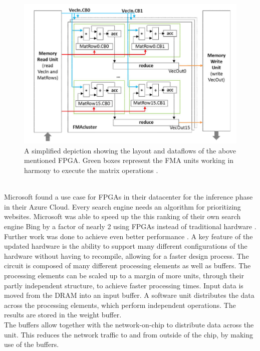 \documentclass[conference]{IEEEtran}
\begin{document}
	\begin{figure}[h]
		\centering
		\includegraphics[width=\linewidth]{pictures/fpga_operations.png}
		\caption{A simplified depiction showing the layout and dataflows of the above mentioned FPGA. Green boxes represent the FMA units working in harmony to execute the matrix operations \cite{nurvitadhi2016accelerating}.}
		\label{fig:fpgahw}
	\end{figure}
	\\
	Microsoft found a use case for FPGAs in their datacenter for the inference phase in their Azure Cloud. Every search engine needs an algorithm for prioritizing websites. Microsoft was able to speed up the this ranking of their own search engine Bing by a factor of nearly 2 using FPGAs instead of traditional hardware \cite{putnam2014reconfigurable}. Further work was done to achieve even better performance \cite{ovtcharov2015accelerating}. A key feature of the updated hardware is the ability to support many different configurations of the hardware without having to recompile, allowing for a faster design process. The circuit is composed of many different processing elements as well as buffers. The processing elements can be scaled up to a margin of more units, through their partly independent structure, to achieve faster processing times. Input data is moved from the DRAM into an input buffer. A software unit distributes the data across the processing elements, which perform independent operations. The results are stored in the weight buffer.
	\\
	The buffers allow together with the network-on-chip to distribute data across the unit. This reduces the network traffic to and from outside of the chip, by making use of the buffers. 
	\\
	
\end{document}
